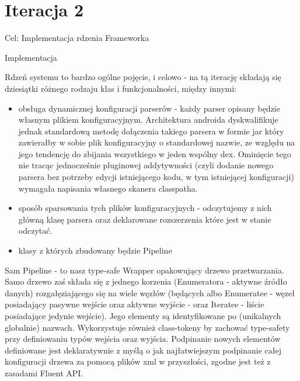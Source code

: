\section{Iteracja 2}
\begin{Note}
Cel:
	Implementacja rdzenia Frameworka

Implementacja

Rdzeń systemu to bardzo ogólne pojęcie, i celowo - na tą iterację składają się dziesiątki różnego rodzaju klas i funkcjonalności, między innymi:
\begin{itemize}
    \item obsługa dynamicznej konfiguracji parserów -  każdy parser opisany będzie własnym plikiem konfiguracyjnym. Architektura androida dyskwalifikuje jednak standardową metodę dołączenia takiego parsera w formie jar który zawierałby w sobie plik konfiguracyjny o standardowej nazwie, ze względu na jego tendencję do zbijania wszystkiego w jeden wspólny dex. Ominięcie tego nie tracąc jednocześnie pluginowej addytywności (czyli dodanie nowego parsera bez potrzeby edycji istniejącego kodu, w tym istniejącej konfiguracji) wymagała napisania własnego skanera classpatha.
    \item sposób sparsowania tych plików konfiguracyjnych - odczytujemy z nich główną klasę parsera oraz deklarowane rozszerzenia które jest w stanie odczytać.
    \item klasy z których zbudowany będzie Pipeline
\end{itemize}

Sam Pipeline - to nasz type-safe Wrapper opakowujący drzewo przetwarzania. Samo drzewo zaś składa się z jednego korzenia (Enumeratora - aktywne źródło danych) rozgałęziającego się na wiele węzłów (będących albo Enumeratee - węzeł posiadający pasywne wejście oraz aktywne wyjście - oraz Iteratee - liście posiadające jedynie wejście). Jego elementy są identyfikowane po (unikalnych globalnie) nazwach. Wykorzystuje również class-tokeny by zachować type-safety przy definiowaniu typów wejścia oraz wyjścia. Podpinanie nowych elementów definiowane jest deklaratywnie z myślą o jak najłatwiejszym podpinanie całej konfiguracji drzewa za pomocą plików xml w przyszłości, zgodne jest też z zasadami Fluent API.


\end{Note}
